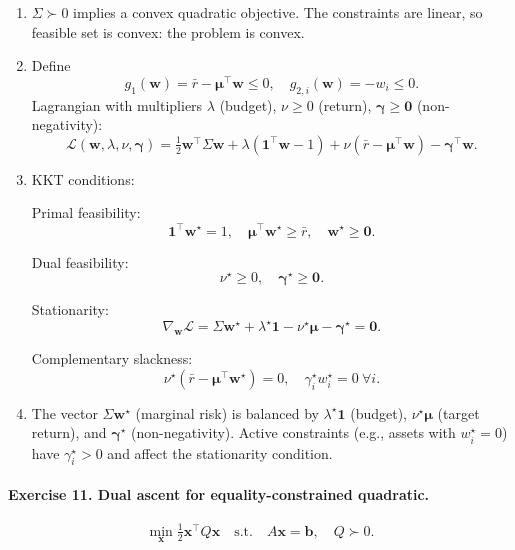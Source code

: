 \documentclass[11pt]{article}
\begin{document}
\begin{enumerate}
\item $\Sigma\succ0$ implies a convex quadratic objective. The constraints are linear, so feasible set is convex: the problem is convex.

\item Define
\[
g_1(\bm{w}) = \bar{r}-\bm{\mu}^\top\bm{w}\le 0,\quad
g_{2,i}(\bm{w}) = -w_i\le 0.
\]
Lagrangian with multipliers $\lambda$ (budget), $\nu\ge0$ (return), $\bm{\gamma}\ge\bm{0}$ (non-negativity):
\[
\mathcal{L}(\bm{w},\lambda,\nu,\bm{\gamma})
=
\tfrac12\bm{w}^\top\Sigma\bm{w}
+ \lambda(\bm{1}^\top\bm{w}-1)
+ \nu(\bar{r}-\bm{\mu}^\top\bm{w})
- \bm{\gamma}^\top\bm{w}.
\]

\item KKT conditions:

Primal feasibility:
\[
\bm{1}^\top\bm{w}^\star=1,\quad
\bm{\mu}^\top\bm{w}^\star\ge\bar{r},\quad
\bm{w}^\star\ge\bm{0}.
\]

Dual feasibility:
\[
\nu^\star\ge0,\quad \bm{\gamma}^\star\ge\bm{0}.
\]

Stationarity:
\[
\nabla_{\bm{w}}\mathcal{L}
=
\Sigma\bm{w}^\star + \lambda^\star \bm{1} - \nu^\star\bm{\mu} - \bm{\gamma}^\star
= \bm{0}.
\]

Complementary slackness:
\[
\nu^\star(\bar{r}-\bm{\mu}^\top\bm{w}^\star)=0,\quad
\gamma_i^\star w_i^\star=0\ \forall i.
\]

\item The vector $\Sigma\bm{w}^\star$ (marginal risk) is balanced by $\lambda^\star \bm{1}$ (budget), $\nu^\star\bm{\mu}$ (target return), and $\bm{\gamma}^\star$ (non-negativity).  
Active constraints (e.g., assets with $w_i^\star=0$) have $\gamma_i^\star>0$ and affect the stationarity condition.
\end{enumerate}

\bigskip

\paragraph{Exercise 11. Dual ascent for equality-constrained quadratic.}

\[
\min_{\bm{x}} \tfrac12\bm{x}^\top Q\bm{x}
\quad\text{s.t.}\quad A\bm{x}=\bm{b},\quad Q\succ 0.
\]
\end{document}
